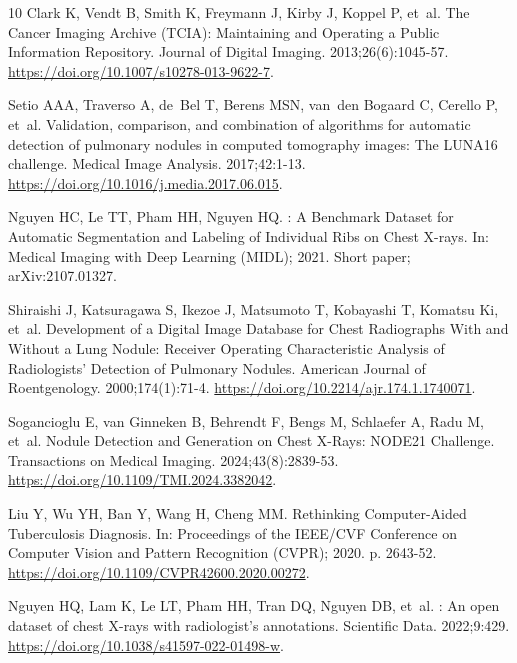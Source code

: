 \begin{thebibliography}{10}
Clark K, Vendt B, Smith K, Freymann J, Kirby J, Koppel P, et~al.
\newblock The {Cancer Imaging Archive (TCIA)}: Maintaining and Operating a
  Public Information Repository.
\newblock Journal of Digital Imaging. 2013;26(6):1045-57.
\newblock \url{https://doi.org/10.1007/s10278-013-9622-7}.

Setio AAA, Traverso A, de~Bel T, Berens MSN, van~den Bogaard C, Cerello P,
  et~al.
\newblock Validation, comparison, and combination of algorithms for automatic
  detection of pulmonary nodules in computed tomography images: The {LUNA16}
  challenge.
\newblock Medical Image Analysis. 2017;42:1-13.
\newblock \url{https://doi.org/10.1016/j.media.2017.06.015}.

Nguyen HC, Le TT, Pham HH, Nguyen HQ.
: A Benchmark Dataset for Automatic Segmentation and
  Labeling of Individual Ribs on Chest {X}-rays.
\newblock In: Medical Imaging with Deep Learning ({MIDL}); 2021. Short paper;
  arXiv:2107.01327.

Shiraishi J, Katsuragawa S, Ikezoe J, Matsumoto T, Kobayashi T, Komatsu Ki,
  et~al.
\newblock Development of a Digital Image Database for Chest Radiographs With
  and Without a Lung Nodule: Receiver Operating Characteristic Analysis of
  Radiologists' Detection of Pulmonary Nodules.
\newblock American Journal of Roentgenology. 2000;174(1):71-4.
\newblock \url{https://doi.org/10.2214/ajr.174.1.1740071}.

Sogancioglu E, van Ginneken B, Behrendt F, Bengs M, Schlaefer A, Radu M, et~al.
\newblock Nodule Detection and Generation on Chest {X}-Rays: {NODE21}
  Challenge.
 Transactions on Medical Imaging. 2024;43(8):2839-53.
\newblock \url{https://doi.org/10.1109/TMI.2024.3382042}.

Liu Y, Wu YH, Ban Y, Wang H, Cheng MM.
\newblock Rethinking Computer-Aided Tuberculosis Diagnosis.
\newblock In: Proceedings of the {IEEE/CVF} Conference on Computer Vision and
  Pattern Recognition ({CVPR}); 2020. p. 2643-52.
\newblock \url{https://doi.org/10.1109/CVPR42600.2020.00272}.

Nguyen HQ, Lam K, Le LT, Pham HH, Tran DQ, Nguyen DB, et~al.
: An open dataset of chest {X}-rays with radiologist's
  annotations.
\newblock Scientific Data. 2022;9:429.
\newblock \url{https://doi.org/10.1038/s41597-022-01498-w}.


\end{thebibliography}
